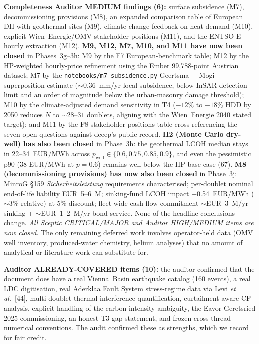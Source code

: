 \documentclass{article}
\begin{document}
\textbf{Completeness Auditor MEDIUM findings (6):} surface subsidence
(M7), decommissioning provisions (M8), an expanded comparison table
of European DH-with-geothermal sites (M9), climate-change feedback on
heat demand (M10), explicit Wien~Energie/OMV stakeholder positions
(M11), and the ENTSO-E hourly extraction (M12). \textbf{M9, M12, M7,
M10, and M11 have now been closed} in Phases~3g--3h: M9 by the F7
European-benchmark table; M12 by the HP-weighted hourly-price refinement
using the Ember 99{,}788-point Austrian dataset; M7 by the
\texttt{notebooks/m7\_subsidence.py} Geertsma + Mogi-superposition
estimate ($\sim 0.36$~mm/yr local subsidence, below InSAR detection limit
and an order of magnitude below the urban-masonry damage threshold);
M10 by the climate-adjusted demand sensitivity in T4 ($-12\%$ to $-18\%$
HDD by 2050 reduces $N$ to $\sim 28$--$31$ doublets, aligning with the
Wien~Energie 2040 stated target); and M11 by the F8 stakeholder-positions
table cross-referencing the seven open questions against deeep's public
record. \textbf{H2 (Monte Carlo dry-well) has also been closed} in
Phase~3h: the geothermal LCOH median stays in 22--34~EUR/MWh across
$p_{\mathrm{well}} \in \{0.6, 0.75, 0.85, 0.9\}$, and even the
pessimistic p90 (38 EUR/MWh at $p=0.6$) remains well below the HP
base case (67). \textbf{M8 (decommissioning provisions) has now also been closed} in
Phase~3j: MinroG §159 \emph{Sicherheitsleistung} requirements
characterised; per-doublet nominal end-of-life liability EUR~5--6~M;
sinking-fund LCOH impact +0.54~EUR/MWh ($\sim 3\%$ relative) at 5\%
discount; fleet-wide cash-flow commitment $\sim$EUR~3~M/yr sinking +
$\sim$EUR~1--2~M/yr bond service. None of the headline conclusions
change. \emph{All Sceptic CRITICAL/MAJOR and Auditor HIGH/MEDIUM
items are now closed.} The only remaining deferred work involves
operator-held data (OMV well inventory, produced-water chemistry,
helium analyses) that no amount of analytical or literature work
can substitute for.

\textbf{Auditor ALREADY-COVERED items (10):} the auditor confirmed
that the document does have a real Vienna~Basin earthquake catalog
(160 events), a real LDC digitisation, real Aderklaa Fault System
stress-regime data via Levi \emph{et al.}\ [44], multi-doublet
thermal interference quantification, curtailment-aware CF analysis,
explicit handling of the carbon-intensity ambiguity, the Eavor
Geretsried 2025 commissioning, an honest T3 gap statement, and
frozen cross-thread numerical conventions. The audit confirmed
these as strengths, which we record for fair credit.
\end{document}
